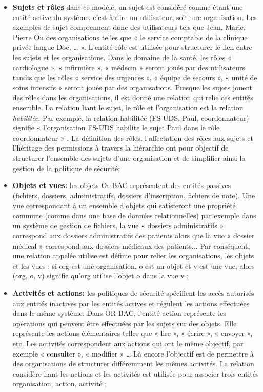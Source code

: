 \label{sectionRelation}

\begin{itemize}
\item \textbf{Sujets et rôles} dans ce modèle, un sujet est considéré comme étant une entité active du système, c'est-à-dire un utilisateur, soit une organisation. Les exemples de sujet comprennent donc des utilisateurs tels que  Jean, Marie, Pierre Ou des organisations telles que «  le service comptable de la clinique privée langue-Doc, … ». L'entité rôle est utilisée pour structurer le lien entre les sujets et les organisations. Dans le domaine de la santé, les rôles « cardiologue », « infirmière », « médecin » seront joués par des utilisateurs tandis que les rôles « service des urgences », « équipe de secours », « unité de soins intensifs » seront joués par des organisations. Puisque les sujets jouent des rôles dans les organisations, il est donné une relation qui relie ces entités ensemble. La relation liant le sujet, le rôle et l'organisation est la relation \textit{habilitée}. Par exemple, la relation habilitée (FS-UDS, Paul, coordonnateur) signifie «  l'organisation FS-UDS habilite le sujet Paul dans le rôle coordonnateur » \cite{theseBenoit}. La définition des rôles, l'affectation des rôles aux sujets et l'héritage des permissions à travers la hiérarchie ont pour objectif de structurer l'ensemble des sujets d'une organisation et de simplifier ainsi la gestion de la politique de sécurité;
\item \textbf{Objets et vues:} les objets Or-BAC représentent des entités passives (fichiers, dossiers, administratifs, dossiers d'inscription, fichiers de note). Une vue correspondant à un ensemble d'objets qui satisferont une propriété commune (comme dans une base de données relationnelles) par exemple dans un système de gestion de fichiers, la vue « dossiers administratifs » correspond aux dossiers administratifs des patients alors que la vue « dossier médical » correspond aux dossiers médicaux des patients... Par conséquent, une relation appelée utilise est définie pour relier les organisations, les objets et les vues : si org est une organisation, o est un objet et v est une vue, alors (org, o, v) signifie qu'org utilise l'objet o dans la vue v \cite{theseBenoit};
\item \textbf{Activités et actions:} les politiques de sécurité spécifient les accès autorisés aux entités inactives par les entités actives et régulent les actions effectuées dans le même système. Dans OR-BAC, l'entité action représente les opérations qui peuvent être effectuées par les sujets sur des objets. Elle représente les actions élémentaires telles que « lire », « écrire », « envoyer », etc. Les activités correspondent aux actions qui ont le même objectif, par exemple « consulter », « modifier » … Là encore l'objectif est de permettre à des organisations de structurer différemment les mêmes activités. La relation considère liant les actions et les activités est utilisée pour associer trois entités organisation, action, activité \cite{kalam03};

\end{itemize}
